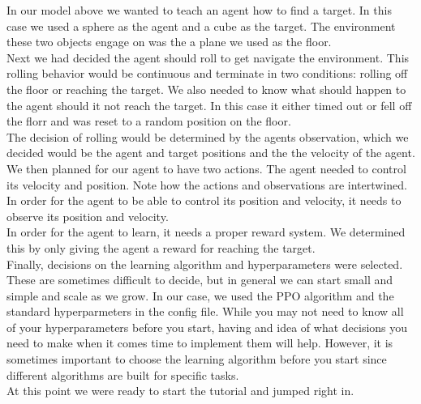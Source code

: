 \documentclass[11pt,fleqn,openany]{book} %
\begin{document}
In our model above we wanted to teach an agent how to find a target. In this case we used a sphere as the agent and a cube as the target. The environment these two objects engage on was the a plane we used as the floor. \\

Next we had decided the agent should roll to get navigate the environment. This rolling behavior would be continuous and terminate in two conditions: rolling off the floor or reaching the target. We also needed to know what should happen to the agent should it not reach the target. In this case it either timed out or fell off the florr and was reset to a random position on the floor. \\

The decision of rolling would be determined by the agents observation, which we decided would be the agent and target positions and the the velocity of the agent.\\

We then planned for our agent to have two actions. The agent needed to control its velocity and position. Note how the actions and observations are intertwined. In order for the agent to be able to control its position and velocity, it needs to observe its position and velocity. \\

In order for the agent to learn, it needs a proper reward system. We determined this by only giving the agent a reward for reaching the target.\\

Finally, decisions on the learning algorithm and hyperparameters were selected. These are sometimes difficult to decide, but in general we can start small and simple and scale as we grow. In our case, we used the PPO algorithm and the standard hyperparmeters in the config file. While you may not need to know all of your hyperparameters before you start, having and idea of what decisions you need to make when it comes time to implement them will help. However, it is sometimes important to choose the learning algorithm before you start since different algorithms are built for specific tasks.\\

At this point we were ready to start the tutorial and jumped right in. \\
\end{document}
